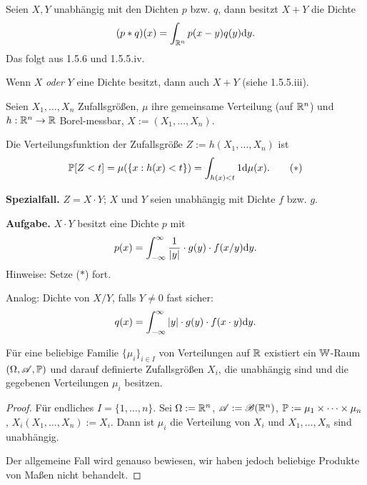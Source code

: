 Seien $X,Y$ unabhängig mit den Dichten $p$ bzw. $q$, dann besitzt $X+Y$ die
Dichte
\[ (p \ast q)(x) = \int_{\mathbb{R}^n} p(x-y) q(y) \mathrm{d} y. \]
Das folgt aus 1.5.6 und 1.5.5.iv.

\begin{rmrk*}
  Wenn $X$ \emph{oder} $Y$ eine Dichte besitzt, dann auch $X+Y$ (siehe
  1.5.5.iii).
\end{rmrk*}

\begin{prgp}
  Seien $X_1, \ldots, X_n$ Zufallsgrößen, $\mu$ ihre gemeinsame Verteilung (auf
  $\mathbb{R}^n$) und $h: \mathbb{R}^n \to \mathbb{R}$ Borel-messbar, $X := (X_1, \ldots,
  X_n)$.

  Die Verteilungsfunktion der Zufallsgröße $Z := h(X_1, \ldots, X_n)$ ist
  \[ \mathbb{P}[ Z < t ] = \mu( \{ x : h(x) < t \} ) = \int_{h(x)<t} 1 \mathrm{d} \mu(x).
    \tag{$\ast$} \]

  \textbf{Spezialfall.} $Z = X \cdot Y$; $X$ und $Y$ seien unabhängig mit Dichte
  $f$ bzw. $g$.

  \textbf{Aufgabe.} $X \cdot Y$ besitzt eine Dichte $p$ mit
  \[ p(x) = \int_{-\infty}^\infty \frac{1}{|y|} \cdot g(y) \cdot f(x/y) \mathrm{d} y. \]
  Hinweise: Setze ($\ast$) fort.

  Analog: Dichte von $X/Y$, falls $Y \ne 0$ fast sicher:
  \[ q(x) = \int_{-\infty}^\infty |y| \cdot g(y) \cdot f(x \cdot y) \mathrm{d}
    y. \]
\end{prgp}

\begin{thm}
  Für eine beliebige Familie $\{ \mu_i \}_{i \in I}$ von Verteilungen auf
  $\mathbb{R}$ existiert ein $\mathbb{W}$-Raum $(\Omega, \mathscr{A}, \mathbb{P})$ und darauf definierte
  Zufallsgrößen $X_i$, die unabhängig sind und die gegebenen Verteilungen
  $\mu_i$ besitzen.
\end{thm}

\begin{proof}
  Für endliches $I = \{1, \ldots, n\}$. Sei $\Omega := \mathbb{R}^n$, $\mathscr{A} :=
  \mathscr{B}(\mathbb{R}^n)$, $\mathbb{P} := \mu_1 \times \cdots \times \mu_n$, $X_i(X_1, \ldots,
  X_n) := X_i$. Dann ist $\mu_i$ die Verteilung von $X_i$ und $X_1, \ldots, X_n$
  sind unabhängig.

  Der allgemeine Fall wird genauso bewiesen, wir haben jedoch beliebige Produkte
  von Maßen nicht behandelt.
\end{proof}

